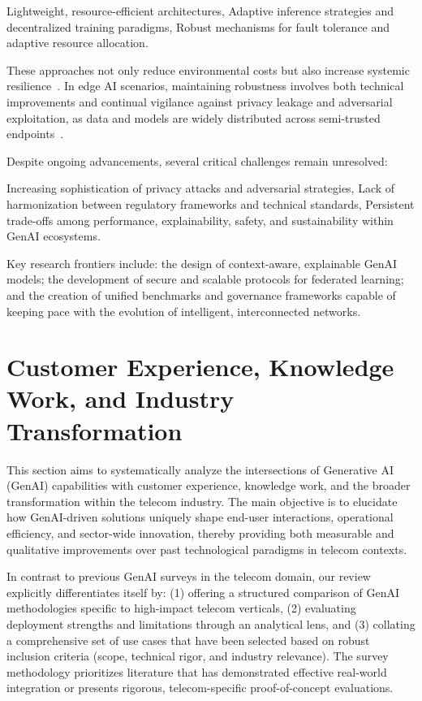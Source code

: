 \documentclass[sigconf]{acmart}
\begin{document}
Lightweight, resource-efficient architectures,
Adaptive inference strategies and decentralized training paradigms,
Robust mechanisms for fault tolerance and adaptive resource allocation.

These approaches not only reduce environmental costs but also increase systemic resilience~\cite{ref7,ref26}. In edge AI scenarios, maintaining robustness involves both technical improvements and continual vigilance against privacy leakage and adversarial exploitation, as data and models are widely distributed across semi-trusted endpoints~\cite{ref48,ref49}.

Despite ongoing advancements, several critical challenges remain unresolved:

Increasing sophistication of privacy attacks and adversarial strategies,
Lack of harmonization between regulatory frameworks and technical standards,
Persistent trade-offs among performance, explainability, safety, and sustainability within GenAI ecosystems.

Key research frontiers include: the design of context-aware, explainable GenAI models; the development of secure and scalable protocols for federated learning; and the creation of unified benchmarks and governance frameworks capable of keeping pace with the evolution of intelligent, interconnected networks.

\section{Customer Experience, Knowledge Work, and Industry Transformation}

This section aims to systematically analyze the intersections of Generative AI (GenAI) capabilities with customer experience, knowledge work, and the broader transformation within the telecom industry. The main objective is to elucidate how GenAI-driven solutions uniquely shape end-user interactions, operational efficiency, and sector-wide innovation, thereby providing both measurable and qualitative improvements over past technological paradigms in telecom contexts.

In contrast to previous GenAI surveys in the telecom domain, our review explicitly differentiates itself by: (1) offering a structured comparison of GenAI methodologies specific to high-impact telecom verticals, (2) evaluating deployment strengths and limitations through an analytical lens, and (3) collating a comprehensive set of use cases that have been selected based on robust inclusion criteria (scope, technical rigor, and industry relevance). The survey methodology prioritizes literature that has demonstrated effective real-world integration or presents rigorous, telecom-specific proof-of-concept evaluations.
\end{document}
